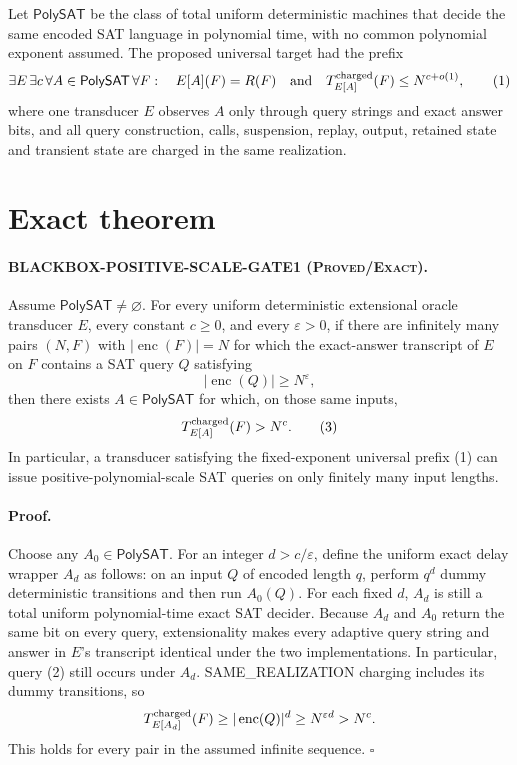 \documentclass[11pt]{article}
\newcommand{\PolySAT}{\mathsf{PolySAT}}
\newcommand{\status}[1]{\textsc{#1}}
\begin{document}
Let $\PolySAT$ be the class of total uniform deterministic machines that
decide the same encoded SAT language in polynomial time, with no common
polynomial exponent assumed.  The proposed universal target had the prefix
\[
 \exists E\,\exists c\,\forall A\in\PolySAT\,\forall F:\quad
 E[A](F)=R(F)\quad\text{and}\quad T^{\rm charged}_{E[A]}(F)\le N^{c+o(1)},
 \tag{1}
\]
where one transducer $E$ observes $A$ only through query strings and exact
answer bits, and all query construction, calls, suspension, replay, output,
retained state and transient state are charged in the same realization.

\section{Exact theorem}

\paragraph{BLACKBOX-POSITIVE-SCALE-GATE1 (\status{Proved/Exact}).}
Assume $\PolySAT\ne\varnothing$.  For every uniform deterministic extensional
oracle transducer $E$, every constant $c\ge0$, and every $\varepsilon>0$, if
there are infinitely many pairs $(N,F)$ with
$|\operatorname{enc}(F)|=N$ for which the exact-answer transcript of $E$ on
$F$ contains a SAT query $Q$ satisfying
\[
 |\operatorname{enc}(Q)|\ge N^\varepsilon,
 \tag{2}
\]
then there exists $A\in\PolySAT$ for which, on those same inputs,
\[
 T^{\rm charged}_{E[A]}(F)>N^c.
 \tag{3}
\]
In particular, a transducer satisfying the fixed-exponent universal prefix
(1) can issue positive-polynomial-scale SAT queries on only finitely many
input lengths.

\paragraph{Proof.}
Choose any $A_0\in\PolySAT$.  For an integer $d>c/\varepsilon$, define the
uniform exact delay wrapper $A_d$ as follows: on an input $Q$ of encoded
length $q$, perform $q^d$ dummy deterministic transitions and then run
$A_0(Q)$.  For each fixed $d$, $A_d$ is still a total uniform polynomial-time
exact SAT decider.  Because $A_d$ and $A_0$ return the same bit on every query,
extensionality makes every adaptive query string and answer in $E$'s
transcript identical under the two implementations.  In particular, query
(2) still occurs under $A_d$.  SAME\_REALIZATION charging includes its dummy
transitions, so
\[
 T^{\rm charged}_{E[A_d]}(F)
 \ge |\operatorname{enc}(Q)|^d
 \ge N^{\varepsilon d}>N^c.
\]
This holds for every pair in the assumed infinite sequence. \hfill$\square$
\end{document}
